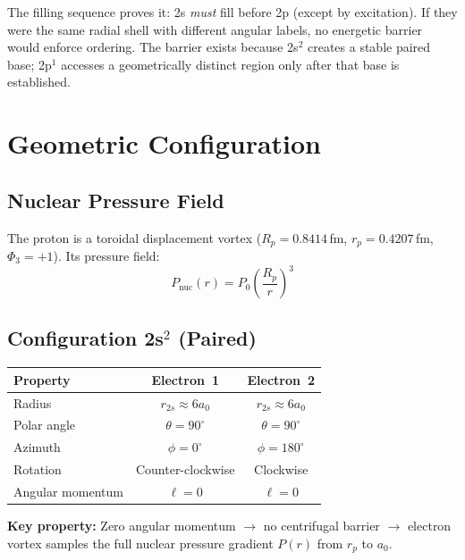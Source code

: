 The filling sequence proves it: 2s \emph{must} fill before 2p (except by excitation).  If they were the same radial shell with different angular labels, no energetic barrier would enforce ordering.  The barrier exists because 2s$^2$ creates a stable paired base; 2p$^1$ accesses a geometrically distinct region only after that base is established.


\section{Geometric Configuration}

\subsection{Nuclear Pressure Field}

The proton is a toroidal displacement vortex ($R_p = 0.8414$\,fm, $r_p = 0.4207$\,fm, $\Phi_3 = +1$).  Its pressure field:
\begin{equation}\label{eq:Pnuc}
  P_{\text{nuc}}(r) = P_0 \left(\frac{R_p}{r}\right)^{\!3}
\end{equation}

\subsection{Configuration 2s$^2$ (Paired)}

\begin{center}
\begin{tabular}{lcc}
\hline
Property & Electron~1 & Electron~2 \\
\hline
Radius & $r_{2s} \approx 6a_0$ & $r_{2s} \approx 6a_0$ \\
Polar angle & $\theta = 90^\circ$ & $\theta = 90^\circ$ \\
Azimuth & $\phi = 0^\circ$ & $\phi = 180^\circ$ \\
Rotation & Counter-clockwise & Clockwise \\
Angular momentum & $\ell = 0$ & $\ell = 0$ \\
\hline
\end{tabular}
\end{center}

\noindent\textbf{Key property:} Zero angular momentum $\to$ no centrifugal barrier $\to$ electron vortex samples the full nuclear pressure gradient $P(r)$ from $r_p$ to $a_0$.

